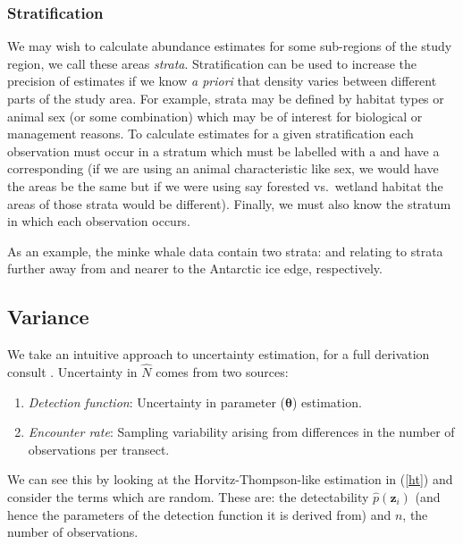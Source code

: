\documentclass[article,shortnames]{jss}
\providecommand{\tightlist}{%
  \setlength{\itemsep}{0pt}\setlength{\parskip}{0pt}}
\begin{document}
\subsubsection{Stratification}\label{stratification}

We may wish to calculate abundance estimates for some sub-regions of the
study region, we call these areas \emph{strata}. Stratification can be
used to increase the precision of estimates if we know \emph{a priori}
that density varies between different parts of the study area. For
example, strata may be defined by habitat types or animal sex (or some
combination) which may be of interest for biological or management
reasons. To calculate estimates for a given stratification each
observation must occur in a stratum which must be labelled with a
 and have a corresponding  (if we are
using an animal characteristic like sex, we would have the areas be the
same but if we were using say forested vs.~wetland habitat the areas of
those strata would be different). Finally, we must also know the stratum
in which each observation occurs.

As an example, the minke whale data contain two strata:  and
 relating to strata further away from and nearer to the
Antarctic ice edge, respectively.

\subsection{Variance}\label{variance}

We take an intuitive approach to uncertainty estimation, for a full
derivation consult \citet{Marques:2003vb}. Uncertainty in \(\hat{N}\)
comes from two sources:

\begin{enumerate}
\def\labelenumi{\arabic{enumi}.}
\tightlist
\item
  \emph{Detection function}: Uncertainty in parameter
  (\(\boldsymbol{\theta}\)) estimation.
\item
  \emph{Encounter rate}: Sampling variability arising from differences
  in the number of observations per transect.
\end{enumerate}

We can see this by looking at the Horvitz-Thompson-like estimation in
(\ref{ht}) and consider the terms which are random. These are: the
detectability \(\hat{p}(\mathbf{z}_i)\) (and hence the parameters of the
detection function it is derived from) and \(n\), the number of
observations.
\end{document}
